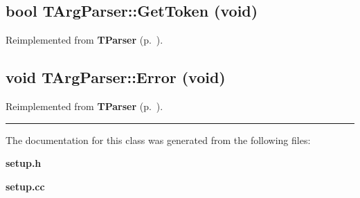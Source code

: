 \subsection{\setlength{\rightskip}{0pt plus 5cm}bool TArg\-Parser::Get\-Token (void)\hspace{0.3cm}{\tt  [virtual]}}



Reimplemented from {\bf TParser} {\rm (p.~\pageref{TParser_a2})}.\label{TArgParser_a2}
\subsection{\setlength{\rightskip}{0pt plus 5cm}void TArg\-Parser::Error (void)\hspace{0.3cm}{\tt  [virtual]}}



Reimplemented from {\bf TParser} {\rm (p.~\pageref{TParser_a3})}.\vspace{0.4cm}\hrule\vspace{0.2cm}
The documentation for this class was generated from the following files:\begin{CompactItemize}
\item 
{\bf setup.h}\item 
{\bf setup.cc}\end{CompactItemize}

